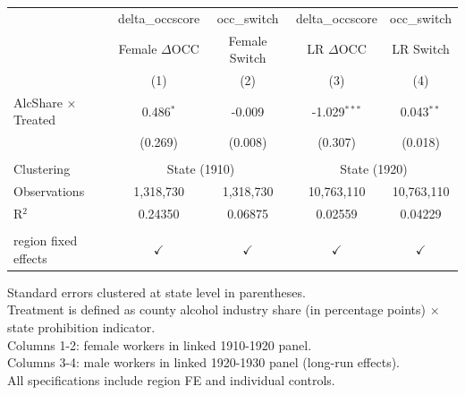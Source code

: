 
\begingroup
\centering
\begin{tabular}{lcccc}
   \toprule
                              & delta\_occscore     & occ\_switch   & delta\_occscore  & occ\_switch\\   
                              & Female $\Delta$OCC  & Female Switch & LR $\Delta$OCC   & LR Switch \\   
                              & (1)                 & (2)           & (3)              & (4)\\  
   \midrule 
   AlcShare $\times$ Treated  & 0.486$^{*}$         & -0.009       & -1.029$^{***}$   & 0.043$^{**}$\\
                              & (0.269)             & (0.008)      & (0.307)          & (0.018)\\   
    \\
   Clustering & \multicolumn{2}{c}{State (1910)} & \multicolumn{2}{c}{State (1920)} \\
   Observations               & 1,318,730           & 1,318,730     & 10,763,110       & 10,763,110\\  
   R$^2$                      & 0.24350             & 0.06875       & 0.02559          & 0.04229\\  
    \\
   region fixed effects       & $\checkmark$        & $\checkmark$  & $\checkmark$     & $\checkmark$\\   
   \bottomrule
\end{tabular}
 
\par \raggedright 
Standard errors clustered at state level in parentheses.\\
Treatment is defined as county alcohol industry share (in percentage points) $\times$ state prohibition indicator.\\
Columns 1-2: female workers in linked 1910-1920 panel.\\
Columns 3-4: male workers in linked 1920-1930 panel (long-run effects).\\
All specifications include region FE and individual controls.
\par\endgroup


